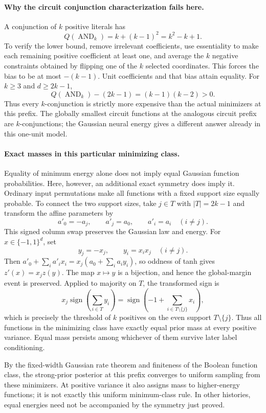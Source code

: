 \paragraph{Why the circuit conjunction characterization fails here.}
A conjunction of $k$ positive literals has
\[
 Q(\operatorname{AND}_k)=k+(k-1)^2=k^2-k+1.
\]
To verify the lower bound, remove irrelevant coefficients, use
essentiality to make each remaining positive coefficient at least one,
and average the $k$ negative constraints obtained by flipping one of
the $k$ selected coordinates. This forces the bias to be at most
$-(k-1)$. Unit coefficients and that bias attain equality.
For $k\ge3$ and $d\ge2k-1$,
\[
 Q(\operatorname{AND}_k)-(2k-1)=(k-1)(k-2)>0.
\]
Thus every $k$-conjunction is strictly more expensive than the actual
minimizers at this prefix. The globally smallest circuit functions
at the analogous circuit prefix are $k$-conjunctions; the Gaussian
neural energy gives a different answer already in this one-unit model.

\paragraph{Exact masses in this particular minimizing class.}
Equality of minimum energy alone does not imply equal Gaussian function
probabilities. Here, however, an additional exact symmetry does imply it.
Ordinary input permutations make all functions with a fixed support
size equally probable. To connect the two support sizes, take
$j\in T$ with $|T|=2k-1$ and transform the affine parameters by
\[
 a'_0=-a_j,\qquad a'_j=a_0,\qquad a'_i=a_i\quad(i\ne j).
\]
This signed column swap preserves the Gaussian law and energy.
For $x\in\{-1,1\}^d$, set
\[
 y_j=-x_j,\qquad y_i=x_ix_j\quad(i\ne j).
\]
Then $a'_0+\sum_i a'_ix_i=x_j(a_0+\sum_i a_iy_i)$, so oddness of
tanh gives $z'(x)=x_jz(y)$. The map $x\mapsto y$ is a bijection,
and hence the global-margin event is preserved. Applied to majority
on $T$, the transformed sign is
\[
 x_j\operatorname{sign}\!\left(\sum_{i\in T}y_i\right)
 =\operatorname{sign}\!\left(-1+\sum_{i\in T\setminus\{j\}}x_i\right),
\]
which is precisely the threshold of $k$ positives on the even support
$T\setminus\{j\}$. Thus all functions in the minimizing class have
exactly equal prior mass at every positive variance. Equal mass persists
among whichever of them survive later label conditioning.

By the fixed-width Gaussian rate theorem and finiteness of the Boolean
function class, the strong-prior posterior at this prefix converges to
uniform sampling from these minimizers. At positive variance it also
assigns mass to higher-energy functions; it is not exactly this uniform
minimum-class rule. In other histories, equal energies need not be
accompanied by the symmetry just proved.

